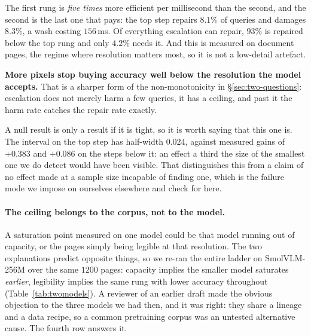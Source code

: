 \documentclass[10pt,twocolumn]{article}
\theoremstyle{plain}
\begin{document}
The first rung is \emph{five times} more efficient per millisecond than the
second, and the second is the last one that pays: the top
step repairs $8.1\%$ of queries and damages $8.3\%$, a wash costing $156$\,ms.
Of everything escalation can repair, $93\%$ is repaired below the top rung and
only $4.2\%$ needs it. And this is measured on document pages, the regime where
resolution matters most, so it is not a low-detail artefact.

\textbf{More pixels stop buying accuracy well below the resolution the model
accepts.} That is a sharper form of the non-monotonicity in
\S\ref{sec:two-questions}: escalation does not merely harm a few queries, it has
a ceiling, and past it the harm rate catches the repair rate exactly.

A null result is only a result if it is tight, so it is worth saying that this
one is. The interval on the top step has half-width $0.024$, against measured
gains of $+0.383$ and $+0.086$ on the steps below it: an effect a third the size
of the smallest one we do detect would have been visible. That distinguishes
this from a claim of no effect made at a sample size incapable of finding one,
which is the failure mode we impose on ourselves elsewhere and check for here.

\paragraph{The ceiling belongs to the corpus, not to the model.} A saturation
point measured on one model could be that model running out of capacity, or the
pages simply being legible at that resolution. The two explanations predict
opposite things, so we re-ran the entire ladder on SmolVLM-256M over the same
$1200$ pages: capacity implies the smaller model saturates \emph{earlier},
legibility implies the same rung with lower accuracy throughout
(Table~\ref{tab:twomodels}). A reviewer of an earlier draft made the obvious
objection to the three models we had then, and it was right: they share a
lineage and a data recipe, so a common pretraining corpus was an untested
alternative cause. The fourth row answers it.
\end{document}
